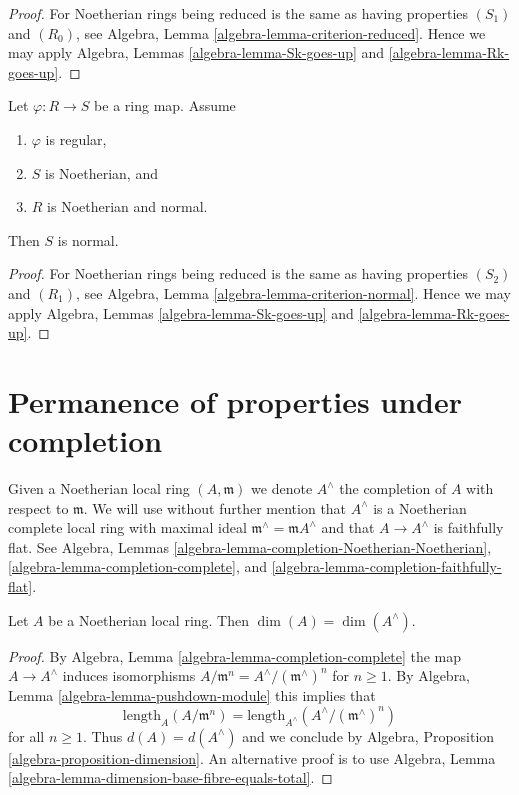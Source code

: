 \begin{proof}
For Noetherian rings being reduced is the same as having properties
$(S_1)$ and $(R_0)$, see
Algebra, Lemma \ref{algebra-lemma-criterion-reduced}.
Hence we may apply
Algebra, Lemmas \ref{algebra-lemma-Sk-goes-up} and
\ref{algebra-lemma-Rk-goes-up}.
\end{proof}

\begin{lemma}
\label{lemma-normal-goes-up}
Let $\varphi : R \to S$ be a ring map. Assume
\begin{enumerate}
\item $\varphi$ is regular,
\item $S$ is Noetherian, and
\item $R$ is Noetherian and normal.
\end{enumerate}
Then $S$ is normal.
\end{lemma}

\begin{proof}
For Noetherian rings being reduced is the same as having properties
$(S_2)$ and $(R_1)$, see
Algebra, Lemma \ref{algebra-lemma-criterion-normal}.
Hence we may apply
Algebra, Lemmas \ref{algebra-lemma-Sk-goes-up} and
\ref{algebra-lemma-Rk-goes-up}.
\end{proof}






\section{Permanence of properties under completion}
\label{section-permanence-completion}

\noindent
Given a Noetherian local ring $(A, \mathfrak m)$ we denote $A^\wedge$
the completion of $A$ with respect to $\mathfrak m$. We will use
without further mention that $A^\wedge$ is a Noetherian complete local ring
with maximal ideal $\mathfrak m^\wedge = \mathfrak m A^\wedge$
and that $A \to A^\wedge$ is faithfully flat.
See Algebra, Lemmas
\ref{algebra-lemma-completion-Noetherian-Noetherian},
\ref{algebra-lemma-completion-complete}, and
\ref{algebra-lemma-completion-faithfully-flat}.

\begin{lemma}
\label{lemma-completion-dimension}
Let $A$ be a Noetherian local ring.
Then $\dim(A) = \dim(A^\wedge)$.
\end{lemma}

\begin{proof}
By Algebra, Lemma \ref{algebra-lemma-completion-complete} the map
$A \to A^\wedge$ induces isomorphisms
$A/\mathfrak m^n = A^\wedge/(\mathfrak m^\wedge)^n$ for $n \geq 1$.
By Algebra, Lemma \ref{algebra-lemma-pushdown-module} this implies that
$$
\text{length}_A(A/\mathfrak m^n) =
\text{length}_{A^\wedge}(A^\wedge/(\mathfrak m^\wedge)^n)
$$
for all $n \geq 1$. Thus $d(A) = d(A^\wedge)$ and we conclude
by Algebra, Proposition \ref{algebra-proposition-dimension}.
An alternative proof is to use
Algebra, Lemma \ref{algebra-lemma-dimension-base-fibre-equals-total}.
\end{proof}


